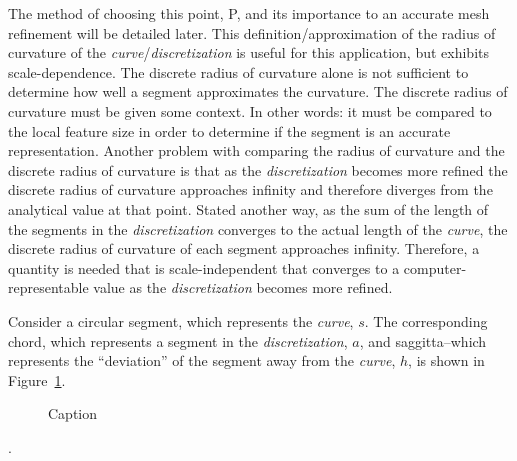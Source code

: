 The method of choosing this point, P, and its importance to an accurate mesh refinement will be detailed later. This definition/approximation of the radius of curvature of the \textit{curve}/\textit{discretization} is useful for this application, but exhibits scale-dependence. The discrete radius of curvature alone is not sufficient to determine how well a segment approximates the curvature. The discrete radius of curvature must be given some context. In other words: it must be compared to the local feature size in order to determine if the segment is an accurate representation. Another problem with comparing the radius of curvature and the discrete radius of curvature is that as the \textit{discretization} becomes more refined the discrete radius of curvature approaches infinity and therefore diverges from the analytical value at that point. Stated another way, as the sum of the length of the segments in the \textit{discretization} converges to the actual length of the \textit{curve}, the discrete radius of curvature of each segment approaches infinity. Therefore, a quantity is needed that is scale-independent that converges to a computer-representable value as the \textit{discretization} becomes more refined.

Consider a circular segment, which represents the \textit{curve}, $s$.  
The corresponding chord, which represents a segment in the 
\textit{discretization}, $a$, and saggitta--which represents the 
``deviation'' of the segment away from the \textit{curve}, $h$, is shown 
in Figure~\ref{CircleGeometry}.

\begin{figure}
  \caption{\label{CircleGeometry} Caption}
\end{figure}.

